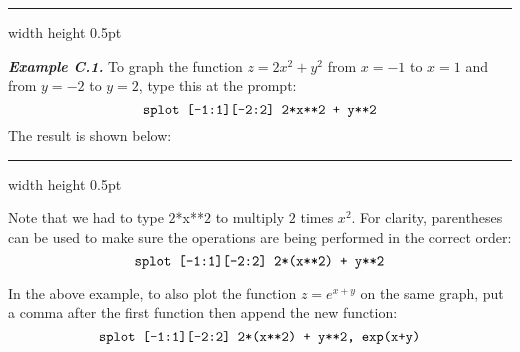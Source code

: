 \vspace{2mm}
\hrule width \textwidth height 0.5pt\vspace{2mm}
\par\noindent \emph{\textbf{Example C.1.}}
 To graph the function $z = 2x^2 + y^2$ from $x=-1$ to $x=1$ and from $y=-2$ to $y=2$, type this at the
 \textbf{} prompt:
 \begin{displaymath}
  \texttt{splot \symbol{91}-1:1\symbol{93}\symbol{91}-2:2\symbol{93} 2*x**2 + y**2}
 \end{displaymath}
 The result is shown below:\vspace{-12mm}
\begin{figure}[h]
 \begin{center}
  
 \end{center}\vspace{-14mm}
\end{figure}
\hrule width \textwidth height 0.5pt
\newpage
\par\noindent Note that we had to type $2$*x**$2$ to multiply $2$ times $x^2$. For clarity, parentheses can be used to
make sure the operations are being performed in the correct order:
\begin{displaymath}
 \texttt{splot \symbol{91}-1:1\symbol{93}\symbol{91}-2:2\symbol{93} 2*(x**2) + y**2}
\end{displaymath}

\par\noindent In the above example,
 to also plot the function $z=e^{x+y}$ on the same graph, put a comma after the first function then
 append the new function:
 \begin{displaymath}
  \texttt{splot \symbol{91}-1:1\symbol{93}\symbol{91}-2:2\symbol{93} 2*(x**2) + y**2, exp(x+y)}
 \end{displaymath}

